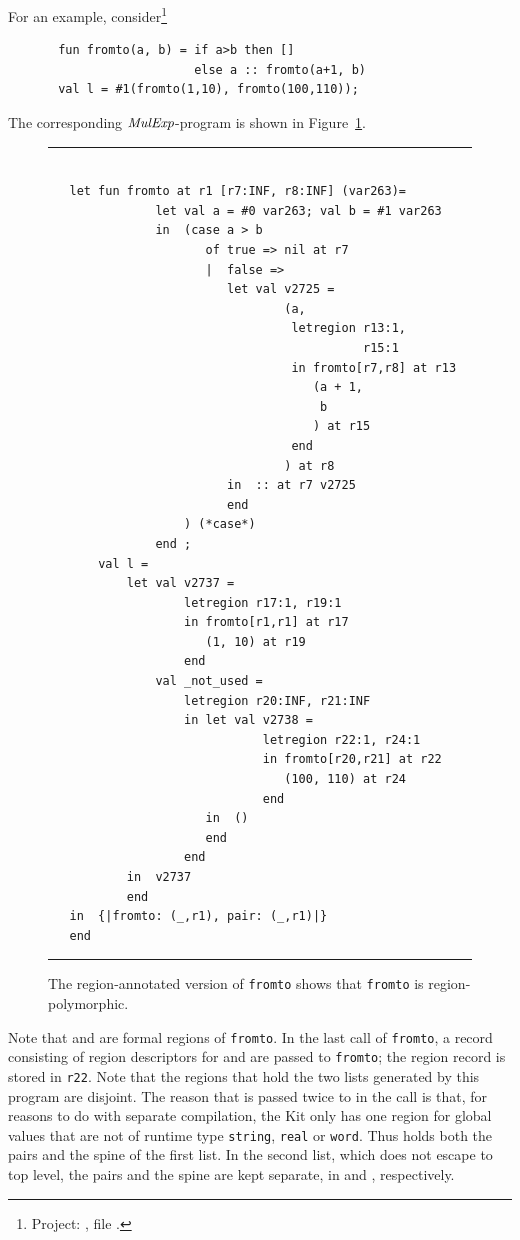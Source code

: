 \documentclass[12pt]{book}
\begin{document}
For an example, consider\footnote{Project: ,
file .}
\begin{verbatim}
       fun fromto(a, b) = if a>b then []
                          else a :: fromto(a+1, b)
       val l = #1(fromto(1,10), fromto(100,110));
\end{verbatim}
The corresponding $\hbox{\it MulExp}$-program is shown in Figure~\ref{fromto.fig}.
\begin{figure}
\hrule
\begin{verbatim}

   let fun fromto at r1 [r7:INF, r8:INF] (var263)= 
               let val a = #0 var263; val b = #1 var263
               in  (case a > b 
                      of true => nil at r7
                      |  false => 
                         let val v2725 = 
                                 (a, 
                                  letregion r13:1, 
                                            r15:1 
                                  in fromto[r7,r8] at r13 
                                     (a + 1, 
                                      b
                                     ) at r15 
                                  end
                                 ) at r8
                         in  :: at r7 v2725
                         end 
                   ) (*case*) 
               end ; 
       val l = 
           let val v2737 = 
                   letregion r17:1, r19:1 
                   in fromto[r1,r1] at r17 
                      (1, 10) at r19 
                   end
               val _not_used = 
                   letregion r20:INF, r21:INF 
                   in let val v2738 = 
                              letregion r22:1, r24:1 
                              in fromto[r20,r21] at r22 
                                 (100, 110) at r24 
                              end
                      in  ()
                      end  
                   end
           in  v2737
           end 
   in  {|fromto: (_,r1), pair: (_,r1)|}
   end 
\end{verbatim}
\caption{The region-annotated version of {\tt fromto} shows that {\tt fromto}
is region-polymorphic.}
\medskip

\hrule
\label{fromto.fig}
\end{figure}
Note that  and  are formal regions of {\tt fromto}.
In the last call of {\tt fromto}, a record consisting
of region descriptors for  and  are passed to {\tt fromto};
the region record is stored in {\tt r22}. Note that the regions that hold
the two lists generated by this program are disjoint. The reason that  is
passed twice to  in the call 
is that, for reasons to do with separate compilation, the Kit only has one region
for global values that 
are not of runtime type {\tt string}, 
{\tt real} or {\tt word}. Thus  holds
both the pairs and the spine of the first list. In the second list, which does not escape to
top level, the pairs and the spine are kept separate, in  and , 
respectively.
\end{document}
